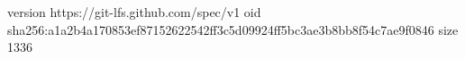 version https://git-lfs.github.com/spec/v1
oid sha256:a1a2b4a170853ef87152622542ff3c5d09924ff5bc3ae3b8bb8f54c7ae9f0846
size 1336
